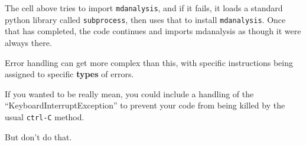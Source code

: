     The cell above tries to import \texttt{mdanalysis}, and if it fails, it
loads a standard python library called \texttt{subprocess}, then uses
that to install \texttt{mdanalysis}. Once that has completed, the code
continues and imports mdanalysis as though it were always there.

Error handling can get more complex than this, with specific
instructions being assigned to specific \textbf{types} of errors.

If you wanted to be really mean, you could include a handling of the
``KeyboardInterruptException'' to prevent your code from being killed by
the usual \texttt{ctrl-C} method.

But don't do that.
